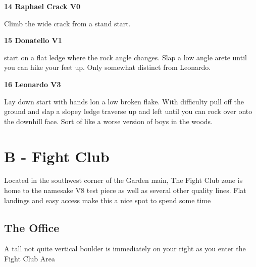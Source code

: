 \begin{multicols}{2}
		
			
			\needspace{1.5cm}
\label{rt:Raphael Crack}
\colorbox{green!20}{
\parbox{0.95\linewidth}{
\textbf{
14 Raphael Crack V0  
}}}

			\begin{adjustwidth}{0.5cm}{}			
			Climb the wide crack from a stand start.
			\end{adjustwidth}
			
			
			
			\needspace{1.5cm}
\label{rt:Donatello}
\colorbox{green!20}{
\parbox{0.95\linewidth}{
\textbf{
15 Donatello V1  
}}}

			\begin{adjustwidth}{0.5cm}{}			
			start on a flat ledge where the rock angle changes. Slap a low angle arete until you can hike your feet up. Only somewhat distinct from Leonardo.
			\end{adjustwidth}
			
			
			
			\needspace{1.5cm}
\label{rt:Leonardo}
\colorbox{green!20}{
\parbox{0.95\linewidth}{
\textbf{
16 Leonardo V3  
}}}

			\begin{adjustwidth}{0.5cm}{}			
			Lay down start with hands lon a low broken flake. With difficulty pull off the ground and slap a slopey ledge traverse up and left until you can rock over onto the downhill face. Sort of like a worse version of boys in the woods.
			\end{adjustwidth}
			
			
		
	
\newpage


		\section{B - Fight Club}\label{sa:Fight Club}
	Located in the southwest corner of the Garden main, The Fight Club zone is home to the namesake V8 test piece as well as several other quality lines. Flat landings and easy access make this a nice spot to spend some time\\

	
	


		\needspace{1.5cm}
		\subsection*{The Office}\label{bf:The Office}
		A tall not quite vertical boulder is immediately on your right as you enter the Fight Club Area\\
	

\end{multicols}

